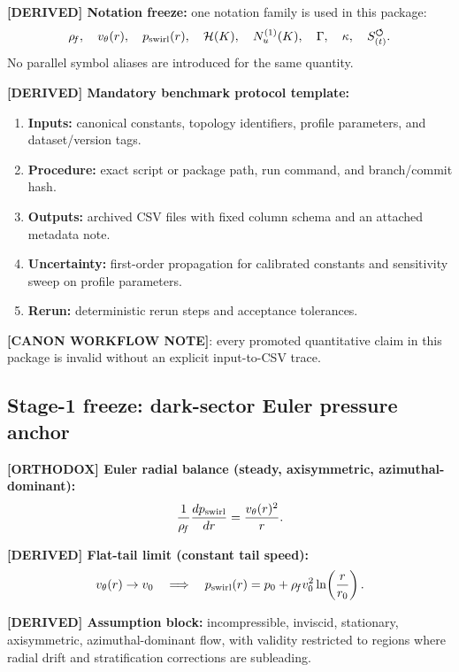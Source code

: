 \textbf{[DERIVED] Notation freeze:} one notation family is used in this package:
\[
\rho_{\!f},\quad v_\theta(r),\quad p_{\mathrm{swirl}}(r),\quad
\mathcal{H}(K),\quad N_u^{(1)}(K),\quad \Gamma,\quad \kappa,\quad {S_{(t)}^{\boldsymbol{\circlearrowleft}}}.
\]
No parallel symbol aliases are introduced for the same quantity.

\textbf{[DERIVED] Mandatory benchmark protocol template:}
\begin{enumerate}
    \item \textbf{Inputs:} canonical constants, topology identifiers, profile parameters, and dataset/version tags.
    \item \textbf{Procedure:} exact script or package path, run command, and branch/commit hash.
    \item \textbf{Outputs:} archived CSV files with fixed column schema and an attached metadata note.
    \item \textbf{Uncertainty:} first-order propagation for calibrated constants and sensitivity sweep on profile parameters.
    \item \textbf{Rerun:} deterministic rerun steps and acceptance tolerances.
\end{enumerate}

\textbf{[CANON WORKFLOW NOTE]}: every promoted quantitative claim in this package is invalid without an explicit input-to-CSV trace.

\subsection{Stage-1 freeze: dark-sector Euler pressure anchor}
\textbf{[ORTHODOX] Euler radial balance (steady, axisymmetric, azimuthal-dominant):}
\begin{align}
    \frac{1}{\rho_{\!f}}\frac{dp_{\mathrm{swirl}}}{dr}
    =
    \frac{v_\theta(r)^2}{r}.
    \label{eq:exec_swirl_pressure}
\end{align}

\textbf{[DERIVED] Flat-tail limit (constant tail speed):}
\begin{align}
    v_\theta(r)\to v_0
    \quad\Longrightarrow\quad
    p_{\mathrm{swirl}}(r)
    =
    p_0 + \rho_{\!f} v_0^2\ln\!\left(\frac{r}{r_0}\right).
\end{align}

\textbf{[DERIVED] Assumption block:}
incompressible, inviscid, stationary, axisymmetric, azimuthal-dominant flow, with validity restricted to regions where radial drift and stratification corrections are subleading.

